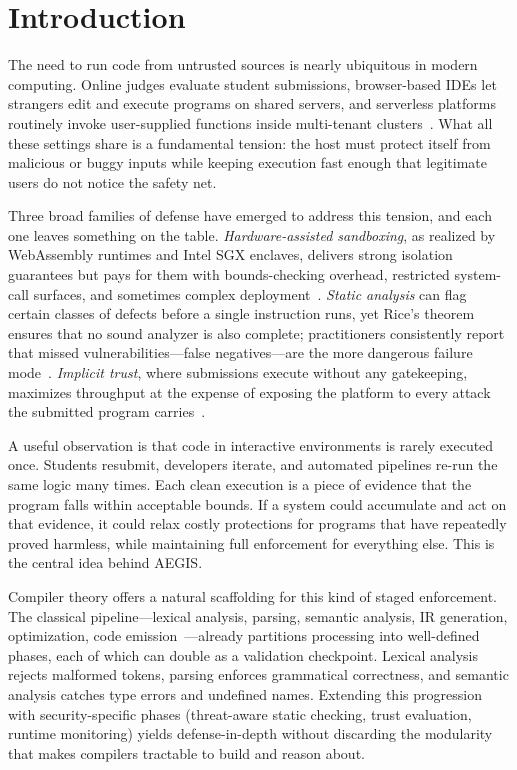 \documentclass[conference]{IEEEtran}
\begin{document}
\section{Introduction}

The need to run code from untrusted sources is nearly
ubiquitous in modern computing.  Online judges evaluate student
submissions, browser-based IDEs let strangers edit and execute
programs on shared servers, and serverless platforms routinely
invoke user-supplied functions inside multi-tenant
clusters~\cite{johnson2023wave,menetrey2024sgx,li2022iot_trust}.
What all these settings share is a fundamental tension:
the host must protect itself from malicious or buggy inputs
while keeping execution fast enough that legitimate users
do not notice the safety net.

Three broad families of defense have emerged to address this
tension, and each one leaves something on the table.
\emph{Hardware-assisted sandboxing}, as realized by WebAssembly
runtimes and Intel SGX enclaves, delivers strong isolation
guarantees but pays for them with bounds-checking overhead,
restricted system-call surfaces, and sometimes complex
deployment~\cite{johnson2023wave,menetrey2024sgx}.
\emph{Static analysis} can flag certain classes of defects
before a single instruction runs, yet Rice's theorem ensures
that no sound analyzer is also complete; practitioners
consistently report that missed vulnerabilities---false
negatives---are the more dangerous failure
mode~\cite{ami2024false_neg,huang2024static}.
\emph{Implicit trust}, where submissions execute without any
gatekeeping, maximizes throughput at the expense of exposing
the platform to every attack the submitted program
carries~\cite{ullah2024deeptrust}.

A useful observation is that code in interactive environments
is rarely executed once.  Students resubmit, developers iterate,
and automated pipelines re-run the same logic many times.  Each
clean execution is a piece of evidence that the program falls
within acceptable bounds.  If a system could accumulate and act
on that evidence, it could relax costly protections for programs
that have repeatedly proved harmless, while maintaining full
enforcement for everything else.  This is the central idea
behind AEGIS.

Compiler theory offers a natural scaffolding for this kind of
staged enforcement.  The classical pipeline---lexical analysis,
parsing, semantic analysis, IR generation, optimization, code
emission~\cite{aho2007compilers}---already partitions processing
into well-defined phases, each of which can double as a
validation checkpoint.  Lexical analysis rejects malformed
tokens, parsing enforces grammatical correctness, and semantic
analysis catches type errors and undefined names.  Extending
this progression with security-specific phases (threat-aware
static checking, trust evaluation, runtime monitoring) yields
defense-in-depth without discarding the modularity that makes
compilers tractable to build and reason about.
\end{document}

